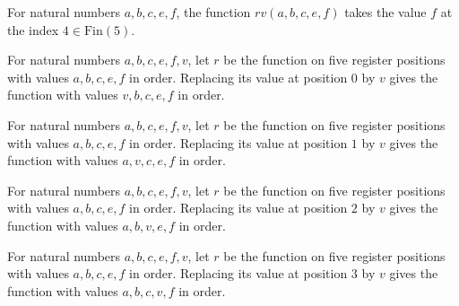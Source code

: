 \begin{lemma}
\label{Complexity.UTab.Front.rv_D}
\leanok
{}
For natural numbers $a,b,c,e,f$, the function $rv(a,b,c,e,f)$ takes the value $f$ at the
index $4\in\mathrm{Fin}(5)$.
\end{lemma}

\begin{lemma}
\label{Complexity.UTab.Front.upd_X}
\leanok
{}
For natural numbers $a,b,c,e,f,v$, let $r$ be the function on five register positions
with values $a,b,c,e,f$ in order. Replacing its value at position $0$ by $v$ gives the
function with values $v,b,c,e,f$ in order.
\end{lemma}

\begin{lemma}
\label{Complexity.UTab.Front.upd_A}
\leanok
{}
For natural numbers $a,b,c,e,f,v$, let $r$ be the function on five register positions
with values $a,b,c,e,f$ in order. Replacing its value at position $1$ by $v$ gives the
function with values $a,v,c,e,f$ in order.
\end{lemma}

\begin{lemma}
\label{Complexity.UTab.Front.upd_B}
\leanok
{}
For natural numbers $a,b,c,e,f,v$, let $r$ be the function on five register positions
with values $a,b,c,e,f$ in order. Replacing its value at position $2$ by $v$ gives the
function with values $a,b,v,e,f$ in order.
\end{lemma}

\begin{lemma}
\label{Complexity.UTab.Front.upd_Tm}
\leanok
{}
For natural numbers $a,b,c,e,f,v$, let $r$ be the function on five register positions
with values $a,b,c,e,f$ in order. Replacing its value at position $3$ by $v$ gives the
function with values $a,b,c,v,f$ in order.
\end{lemma}


